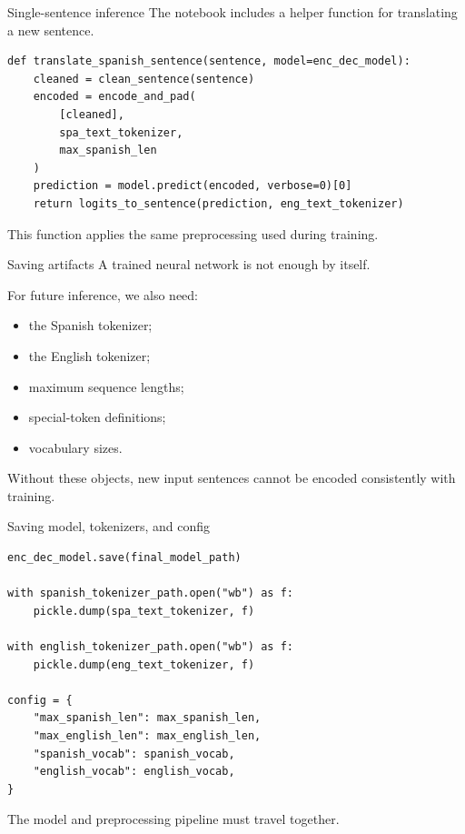 \documentclass[aspectratio=169]{beamer}
\begin{document}
%
%
\begin{frame}[fragile]{Single-sentence inference}
The notebook includes a helper function for translating a new sentence.

\begin{lstlisting}
def translate_spanish_sentence(sentence, model=enc_dec_model):
    cleaned = clean_sentence(sentence)
    encoded = encode_and_pad(
        [cleaned],
        spa_text_tokenizer,
        max_spanish_len
    )
    prediction = model.predict(encoded, verbose=0)[0]
    return logits_to_sentence(prediction, eng_text_tokenizer)
\end{lstlisting}

This function applies the same preprocessing used during training.
\end{frame}
%
%
\begin{frame}[fragile]{Saving artifacts}
A trained neural network is not enough by itself.

\vspace{0.3cm}
For future inference, we also need:
\begin{itemize}
    \item the Spanish tokenizer;
    \item the English tokenizer;
    \item maximum sequence lengths;
    \item special-token definitions;
    \item vocabulary sizes.
\end{itemize}

\vspace{0.3cm}
Without these objects, new input sentences cannot be encoded consistently with training.
\end{frame}
%
%
\begin{frame}[fragile]{Saving model, tokenizers, and config}
\begin{lstlisting}
enc_dec_model.save(final_model_path)

with spanish_tokenizer_path.open("wb") as f:
    pickle.dump(spa_text_tokenizer, f)

with english_tokenizer_path.open("wb") as f:
    pickle.dump(eng_text_tokenizer, f)

config = {
    "max_spanish_len": max_spanish_len,
    "max_english_len": max_english_len,
    "spanish_vocab": spanish_vocab,
    "english_vocab": english_vocab,
}
\end{lstlisting}

The model and preprocessing pipeline must travel together.
\end{frame}
\end{document}
